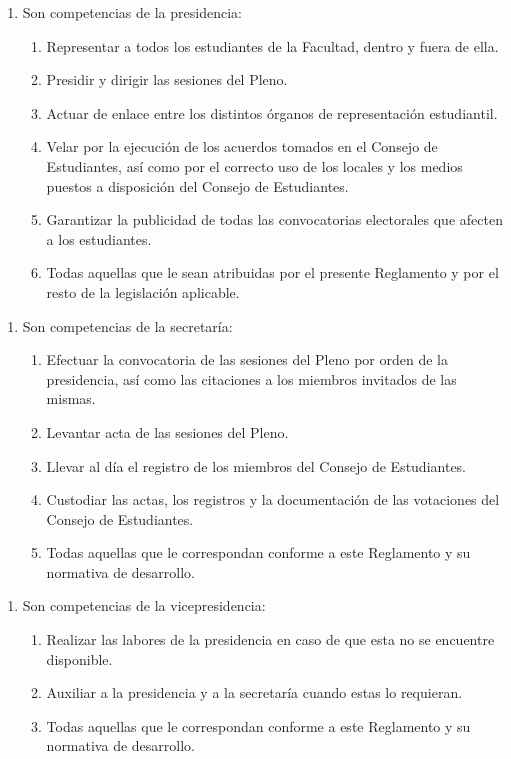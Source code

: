 \documentclass[11pt,a4paper]{article}
\begin{document}
\begin{enumerate}
\item Son competencias de la presidencia:
  \begin{enumerate}
    \item Representar a todos los estudiantes de la Facultad, dentro y fuera de ella.
    \item Presidir y dirigir las sesiones del Pleno.
    \item Actuar de enlace entre los distintos órganos de representación estudiantil.
    \item Velar por la ejecución de los acuerdos tomados en el Consejo de Estudiantes, así como por el correcto uso de los locales y los medios puestos a disposición del Consejo de Estudiantes.
    \item Garantizar la publicidad de todas las convocatorias electorales que afecten a los estudiantes.
    \item Todas aquellas que le sean atribuidas por el presente Reglamento y por el resto de la legislación aplicable.
  \end{enumerate}
\end{enumerate}

\begin{enumerate}
\item Son competencias de la secretaría:
  \begin{enumerate}
    \item Efectuar la convocatoria de las sesiones del Pleno por orden de la presidencia, así como las citaciones a los miembros invitados de las mismas.
    \item Levantar acta de las sesiones del Pleno.
    \item Llevar al día el registro de los miembros del Consejo de Estudiantes.
    \item Custodiar las actas, los registros y la documentación de las votaciones del Consejo de Estudiantes.
    \item Todas aquellas que le correspondan conforme a este Reglamento y su normativa de desarrollo.
  \end{enumerate}
\end{enumerate}

\begin{enumerate}
\item Son competencias de la vicepresidencia:
  \begin{enumerate}
    \item Realizar las labores de la presidencia en caso de que esta no se encuentre disponible.
    \item Auxiliar a la presidencia y a la secretaría cuando estas lo requieran.
    \item Todas aquellas que le correspondan conforme a este Reglamento y su normativa de desarrollo.
  \end{enumerate}
\end{enumerate}
\end{document}
